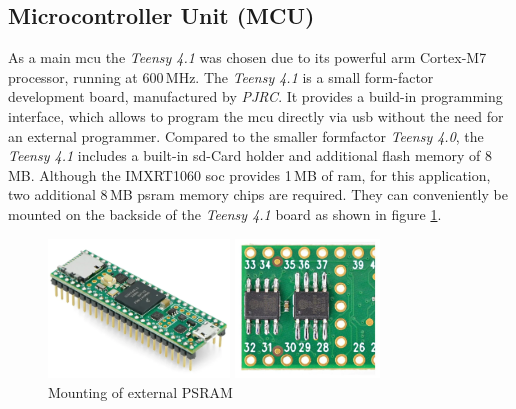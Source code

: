 \subsection{Microcontroller Unit (MCU)}
As a main \acrshort{mcu} the \textit{Teensy 4.1} was chosen due to its powerful \acrshort{arm} Cortex-M7 processor, running at 600\,MHz.
The \textit{Teensy 4.1} is a small form-factor development board, manufactured by \textit{PJRC}.
It provides a build-in programming interface, which allows to program the \acrshort{mcu} directly via \acrshort{usb} without the need for an external programmer.
Compared to the smaller formfactor \textit{Teensy 4.0}, the \textit{Teensy 4.1} includes a built-in \acrshort{sd}-Card holder and additional flash memory of 8\,MB.
Although the IMXRT1060 \acrshort{soc} provides 1\,MB of \acrshort{ram}, for this application, two additional 8\,MB \acrshort{psram} memory chips are required.
They can conveniently be mounted on the backside of the \textit{Teensy 4.1} board as shown in figure \ref{fig:teensy_psram}.
\begin{figure}[h!]
	\centering
	\begin{minipage}{0.49\textwidth}
		\centering
		\includegraphics[height=3.7cm]{images/4_design_acquisition_system/teensy_image.png}
		\vspace{-0.2cm}
		\caption{Teensy 4.1}
		\label{fig:teensy_4_1}
	\end{minipage}
	\begin{minipage}{0.49\textwidth}
		\centering
		\includegraphics[height=3.7cm]{images/4_design_acquisition_system/teensy_psram.png}
		\vspace{-0.2cm}
		\caption{Mounting of external PSRAM}
		\label{fig:teensy_psram}
	\end{minipage}
\end{figure}
\newpage


